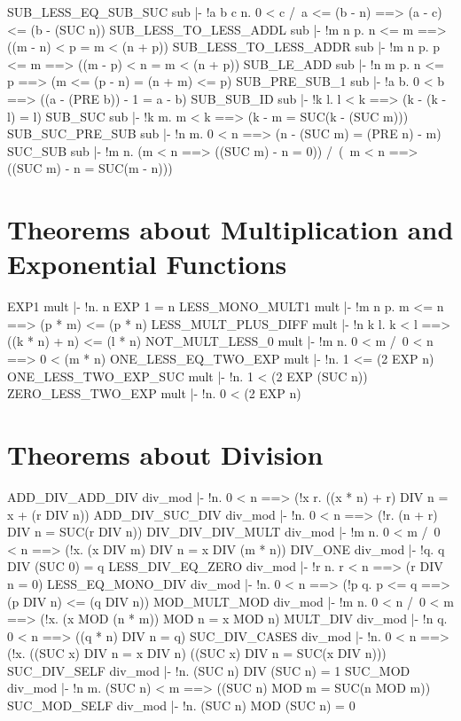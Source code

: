 \ENDTHEOREM
\THEOREM SUB\_LESS\_EQ\_SUB\_SUC sub
|- !a b c n. 0 < c /\ a <= (b - n) ==> (a - c) <= (b - (SUC n))
\ENDTHEOREM
\THEOREM SUB\_LESS\_TO\_LESS\_ADDL sub
|- !m n p. n <= m ==> ((m - n) < p = m < (n + p))
\ENDTHEOREM
\THEOREM SUB\_LESS\_TO\_LESS\_ADDR sub
|- !m n p. p <= m ==> ((m - p) < n = m < (n + p))
\ENDTHEOREM
\THEOREM SUB\_LE\_ADD sub
|- !n m p. n <= p ==> (m <= (p - n) = (n + m) <= p)
\ENDTHEOREM
\THEOREM SUB\_PRE\_SUB\_1 sub
|- !a b. 0 < b ==> ((a - (PRE b)) - 1 = a - b)
\ENDTHEOREM
\THEOREM SUB\_SUB\_ID sub
|- !k l. l < k ==> (k - (k - l) = l)
\ENDTHEOREM
\THEOREM SUB\_SUC sub
|- !k m. m < k ==> (k - m = SUC(k - (SUC m)))
\ENDTHEOREM
\THEOREM SUB\_SUC\_PRE\_SUB sub
|- !n m. 0 < n ==> (n - (SUC m) = (PRE n) - m)
\ENDTHEOREM
\THEOREM SUC\_SUB sub
|- !m n.
    (m < n ==> ((SUC m) - n = 0)) /\
    (~m < n ==> ((SUC m) - n = SUC(m - n)))
\ENDTHEOREM
\section{Theorems about Multiplication and Exponential Functions}
\THEOREM EXP1 mult
|- !n. n EXP 1 = n
\ENDTHEOREM
\THEOREM LESS\_MONO\_MULT1 mult
|- !m n p. m <= n ==> (p * m) <= (p * n)
\ENDTHEOREM
\THEOREM LESS\_MULT\_PLUS\_DIFF mult
|- !n k l. k < l ==> ((k * n) + n) <= (l * n)
\ENDTHEOREM
\THEOREM NOT\_MULT\_LESS\_0 mult
|- !m n. 0 < m /\ 0 < n ==> 0 < (m * n)
\ENDTHEOREM
\THEOREM ONE\_LESS\_EQ\_TWO\_EXP mult
|- !n. 1 <= (2 EXP n)
\ENDTHEOREM
\THEOREM ONE\_LESS\_TWO\_EXP\_SUC mult
|- !n. 1 < (2 EXP (SUC n))
\ENDTHEOREM
\THEOREM ZERO\_LESS\_TWO\_EXP mult
|- !n. 0 < (2 EXP n)
\ENDTHEOREM
\section{Theorems about Division}
\THEOREM ADD\_DIV\_ADD\_DIV div\_mod
|- !n. 0 < n ==> (!x r. ((x * n) + r) DIV n = x + (r DIV n))
\ENDTHEOREM
\THEOREM ADD\_DIV\_SUC\_DIV div\_mod
|- !n. 0 < n ==> (!r. (n + r) DIV n = SUC(r DIV n))
\ENDTHEOREM
\THEOREM DIV\_DIV\_DIV\_MULT div\_mod
|- !m n. 0 < m /\ 0 < n ==> (!x. (x DIV m) DIV n = x DIV (m * n))
\ENDTHEOREM
\THEOREM DIV\_ONE div\_mod
|- !q. q DIV (SUC 0) = q
\ENDTHEOREM
\THEOREM LESS\_DIV\_EQ\_ZERO div\_mod
|- !r n. r < n ==> (r DIV n = 0)
\ENDTHEOREM
\THEOREM LESS\_EQ\_MONO\_DIV div\_mod
|- !n. 0 < n ==> (!p q. p <= q ==> (p DIV n) <= (q DIV n))
\ENDTHEOREM
\THEOREM MOD\_MULT\_MOD div\_mod
|- !m n. 0 < n /\ 0 < m ==> (!x. (x MOD (n * m)) MOD n = x MOD n)
\ENDTHEOREM
\THEOREM MULT\_DIV div\_mod
|- !n q. 0 < n ==> ((q * n) DIV n = q)
\ENDTHEOREM
\THEOREM SUC\_DIV\_CASES div\_mod
|- !n.
    0 < n ==>
    (!x. ((SUC x) DIV n = x DIV n) \/ ((SUC x) DIV n = SUC(x DIV n)))
\ENDTHEOREM
\THEOREM SUC\_DIV\_SELF div\_mod
|- !n. (SUC n) DIV (SUC n) = 1
\ENDTHEOREM
\THEOREM SUC\_MOD div\_mod
|- !n m. (SUC n) < m ==> ((SUC n) MOD m = SUC(n MOD m))
\ENDTHEOREM
\THEOREM SUC\_MOD\_SELF div\_mod
|- !n. (SUC n) MOD (SUC n) = 0
\ENDTHEOREM
